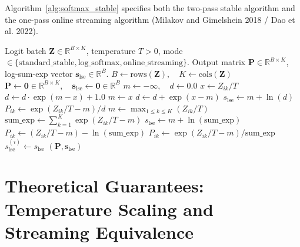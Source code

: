 \documentclass[11pt]{article}
\begin{document}
Algorithm~\ref{alg:softmax_stable} specifies both the two-pass stable algorithm and the one-pass online streaming algorithm (Milakov and Gimelshein 2018 / Dao et al. 2022).

\begin{algorithm}[H]
\caption{Numerically Stable Softmax and Online Streaming Evaluation}
\label{alg:softmax_stable}
\begin{algorithmic}[1]
\Require Logit batch $\mathbf{Z} \in \mathbb{R}^{B \times K}$, temperature $T > 0$, mode $\in \{\text{standard\_stable}, \text{log\_softmax}, \text{online\_streaming}\}$.
\Ensure Output matrix $\mathbf{P} \in \mathbb{R}^{B \times K}$, log-sum-exp vector $\mathbf{s}_{\text{lse}} \in \mathbb{R}^B$.
\State $B \gets \text{rows}(\mathbf{Z}), \quad K \gets \text{cols}(\mathbf{Z})$
\State $\mathbf{P} \gets \mathbf{0} \in \mathbb{R}^{B \times K}, \quad \mathbf{s}_{\text{lse}} \gets \mathbf{0} \in \mathbb{R}^B$
        \State $m \gets -\infty, \quad d \gets 0.0$
            \State $x \gets Z_{ik} / T$
                \State $d \gets d \cdot \exp(m - x) + 1.0$
                \State $m \gets x$
            \Else
                \State $d \gets d + \exp(x - m)$
            \EndIf
        \EndFor
        \State $s_{\text{lse}} \gets m + \ln(d)$
            \State $P_{ik} \gets \exp(Z_{ik}/T - m) / d$
        \EndFor
    \Else
        \State $m \gets \max_{1 \le k \le K} (Z_{ik} / T)$
        \State $\text{sum\_exp} \gets \sum_{k=1}^K \exp(Z_{ik} / T - m)$
        \State $s_{\text{lse}} \gets m + \ln(\text{sum\_exp})$
                \State $P_{ik} \gets (Z_{ik} / T - m) - \ln(\text{sum\_exp})$
            \Else
                \State $P_{ik} \gets \exp(Z_{ik} / T - m) / \text{sum\_exp}$
            \EndIf
        \EndFor
    \EndIf
    \State $s_{\text{lse}}^{(i)} \gets s_{\text{lse}}$
\EndFor
\State \Return $(\mathbf{P}, \mathbf{s}_{\text{lse}})$
\end{algorithmic}
\end{algorithm}

\section{Theoretical Guarantees: Temperature Scaling and Streaming Equivalence}
\label{sec:correctness}
\end{document}
